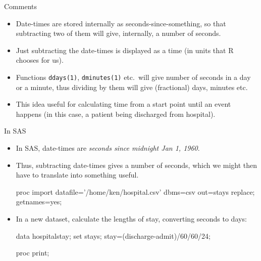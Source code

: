 \documentclass[unknownkeysallowed]{beamer}\usepackage[]{graphicx}\usepackage[]{color}
\begin{document}
\begin{frame}[fragile]{Comments}
  
  \begin{itemize}
  \item Date-times are stored internally as seconds-since-something,
    so that subtracting two of them will give, internally, a number of
    seconds. 
  \item Just subtracting the date-times is displayed as a time (in
    units that R chooses for us).
  \item Functions \texttt{ddays(1)}, \texttt{dminutes(1)} etc.\ will
    give number of seconds in a day or a minute,
    thus dividing by them will give (fractional) days, minutes etc.
  \item This idea useful for calculating time from a start point until
    an event happens (in this case, a patient being discharged from
    hospital). 
  \end{itemize}
  
\end{frame}

\begin{frame}[fragile]{In SAS}
  
  \begin{itemize}
  \item In SAS, date-times are \emph{seconds since midnight Jan 1,
      1960}.
  \item Thus, subtracting date-times gives a number of seconds, which
    we might then have to translate into something useful.

    \begin{small}
\begin{Datastep}
proc import
  datafile='/home/ken/hospital.csv'
    dbms=csv
    out=stays
    replace;
  getnames=yes;
\end{Datastep}      
    \end{small}
    
  \item In a new dataset, calculate the lengths of stay, converting
    seconds to days:

    \begin{Datastep}
data hospitalstay;
  set stays;
  stay=(discharge-admit)/60/60/24;
    \end{Datastep}
    \begin{Sascode}[store=dq]
proc print;          
    \end{Sascode}
      
    
  \end{itemize}
  
\end{frame}
\end{document}
